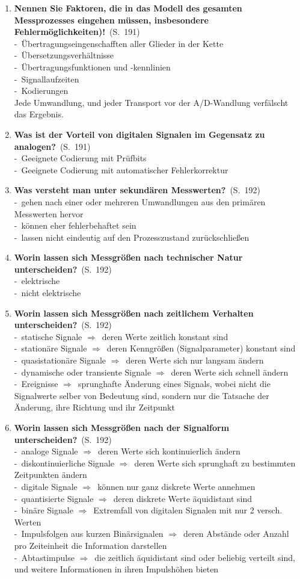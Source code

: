 \documentclass[a4paper,12pt]{article}
\newcommand{\question}[3]{\pagebreak[3]\item {\textbf{#1?}}\ (S.\ #2)#3}
\newcommand{\statement}[3]{\pagebreak[3]\item {\textbf{#1!}}\ (S.\ #2)#3}
\newcommand{\catchword}[1]{\\-\ #1}
\newcommand{\normaltext}[1]{\\#1}
\newcommand{\resultol}[1]{$\Rightarrow$\ #1}
\newcommand{\page}[1]{#1}
\begin{document}
\begin{enumerate}
  \statement{Nennen Sie Faktoren, die in das Modell des gesamten Messprozesses eingehen müssen,
             insbesondere Fehlermöglichkeiten)}{\page{191}} 
  {
    \catchword{Übertragungseingenschafften aller Glieder in der Kette}
    \catchword{Übersetzungsverhältnisse}
    \catchword{Übertragungsfunktionen und -kennlinien}
    \catchword{Signallaufzeiten}
    \catchword{Kodierungen}
    \normaltext{Jede Umwandlung, und jeder Transport vor der A/D-Wandlung verfälscht das Ergebnis.}
  }

  \question{Was ist der Vorteil von digitalen Signalen im Gegensatz zu analogen}{\page{191}}
  {
    \catchword{Geeignete Codierung mit Prüfbits}
    \catchword{Geeignete Codierung mit automatischer Fehlerkorrektur}
  }

  \question{Was versteht man unter sekundären Messwerten}{\page{192}}
  {
    \catchword{gehen nach einer oder mehreren Umwandlungen aus den primären Messwerten hervor}
    \catchword{können eher fehlerbehaftet sein}
    \catchword{lassen nicht eindeutig auf den Prozesszustand zurückschließen}
  }

  \question{Worin lassen sich Messgrößen nach technischer Natur unterscheiden}{\page{192}}
  {
    \catchword{elektrische}
    \catchword{nicht elektrische}
  }

  \question{Worin lassen sich Messgrößen nach zeitlichem Verhalten unterscheiden}{\page{192}}
  {
    \catchword{statische Signale \resultol{deren Werte zeitlich konstant sind}}
    \catchword{stationäre Signale \resultol{deren Kenngrößen (Signalparameter) konstant sind}}
    \catchword{quasistationäre Signale \resultol{deren Werte sich nur langsam ändern}}
    \catchword{dynamische oder transiente Signale \resultol{deren Werte sich schnell ändern}}
    \catchword{Ereignisse \resultol{sprunghafte Änderung eines Signals, wobei nicht die Signalwerte 
               selber von Bedeutung sind, sondern nur die Tatsache der Änderung, ihre Richtung
               und ihr Zeitpunkt}}
  }

  \question{Worin lassen sich Messgrößen nach der Signalform unterscheiden}{\page{192}}
  {
    \catchword{analoge Signale \resultol{deren Werte sich kontinuierlich ändern}}
    \catchword{diskontinuierliche Signale \resultol{deren Werte sich sprunghaft zu bestimmten
               Zeitpunkten ändern}}
    \catchword{digitale Signale \resultol{können nur ganz diskrete Werte annehmen}}
    \catchword{quantisierte Signale \resultol{deren diskrete Werte äquidistant sind}}
    \catchword{binäre Signale \resultol{Extremfall von digitalen Signalen mit nur 2 versch. Werten}}
    \catchword{Impulsfolgen aus kurzen Binärsignalen \resultol{deren Abstände oder Anzahl pro 
               Zeiteinheit die Information darstellen}}
    \catchword{Abtastimpulse \resultol{die zeitlich äquidistant sind oder beliebig verteilt sind,
               und weitere Informationen in ihren Impulshöhen bieten}}
  }


\end{enumerate}
\end{document}
